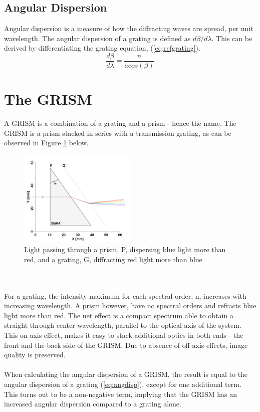 \subsection{Angular Dispersion}
Angular dispersion is a measure of how the diffracting waves are spread, per unit wavelength. The angular dispersion of a grating is defined as $d\beta/d\lambda$. This can be derived by differentiating the grating equation, (\ref{eq:refgrating}). 
\begin{equation}
    \frac{d\beta}{d\lambda} = \frac{n}{a cos(\beta)}
    \label{eq:angdisp}
\end{equation}

\section{The GRISM} \label{sec:grism}
A GRISM is a combination of a grating and a prism - hence the name. The GRISM is a prism stacked in series with a transmission grating, as can be observed in Figure \ref{fig:grism} below.
\begin{figure}[H]
    \centering
    \includegraphics[width=0.5\textwidth]{Images/theory/GRISM.png}
    \caption{Light passing through a prism, P, dispersing blue light more than red, and a grating, G, diffracting red light more than blue}
    \label{fig:grism}
\end{figure}
\\\\
\noindent
For a grating, the intensity maximum for each spectral order, n, increases with increasing wavelength. A prism however, have no spectral orders and refracts blue light more than red. The net effect is a compact spectrum able to obtain a straight through center wavelength, parallel to the optical axis of the system. This on-axis effect, makes it easy to stack additional optics in both ends - the front and the back side of the GRISM. Due to absence of off-axis effects, image quality is preserved.
\\\\
When calculating the angular dispersion of a GRISM, the result is equal to the angular dispersion of a grating (\ref{eq:angdisp}), except for one additional term. This turns out to be a non-negative term, implying that the GRISM has an increased angular dispersion compared to a grating alone.

